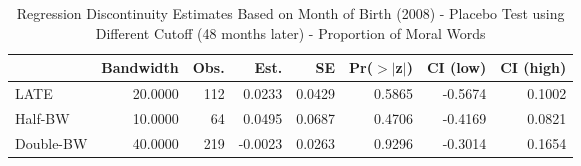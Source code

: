 \begin{table}[ht]
\centering
\begin{tabular}{lrrrrrrr}
  \hline
 & Bandwidth & Obs. & Est. & SE & Pr($>$$|$z$|$) & CI (low) & CI (high) \\ 
  \hline
LATE & 20.0000 & 112 & 0.0233 & 0.0429 & 0.5865 & -0.5674 & 0.1002 \\ 
  Half-BW & 10.0000 & 64 & 0.0495 & 0.0687 & 0.4706 & -0.4169 & 0.0821 \\ 
  Double-BW & 40.0000 & 219 & -0.0023 & 0.0263 & 0.9296 & -0.3014 & 0.1654 \\ 
   \hline
\end{tabular}
\caption{Regression Discontinuity Estimates Based on Month of Birth (2008) - Placebo Test using Different Cutoff (48 months later) - Proportion of Moral Words} 
\label{tab:Xrd2008m_plac}
\end{table}
